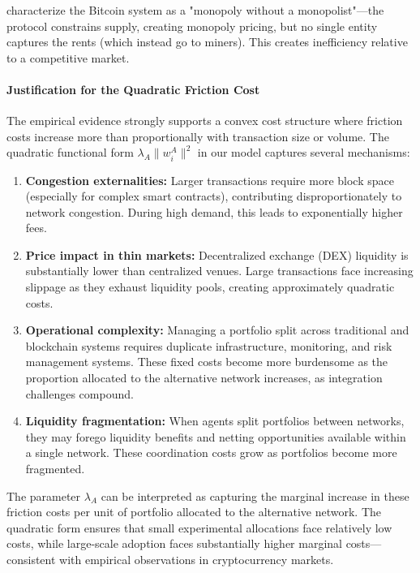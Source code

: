  characterize the Bitcoin system as a "monopoly without a monopolist"—the protocol constrains supply, creating monopoly pricing, but no single entity captures the rents (which instead go to miners). This creates inefficiency relative to a competitive market.


\paragraph{Justification for the Quadratic Friction Cost}

The empirical evidence strongly supports a convex cost structure where friction costs increase more than proportionally with transaction size or volume. The quadratic functional form $\lambda_A \|w_i^A\|^2$ in our model captures several mechanisms:

\begin{enumerate}
    \item \textbf{Congestion externalities:} Larger transactions require more block space (especially for complex smart contracts), contributing disproportionately to network congestion. During high demand, this leads to exponentially higher fees.
    
    \item \textbf{Price impact in thin markets:} Decentralized exchange (DEX) liquidity is substantially lower than centralized venues. Large transactions face increasing slippage as they exhaust liquidity pools, creating approximately quadratic costs.
    
    \item \textbf{Operational complexity:} Managing a portfolio split across traditional and blockchain systems requires duplicate infrastructure, monitoring, and risk management systems. These fixed costs become more burdensome as the proportion allocated to the alternative network increases, as integration challenges compound.
    
    \item \textbf{Liquidity fragmentation:} When agents split portfolios between networks, they may forego liquidity benefits and netting opportunities available within a single network. These coordination costs grow as portfolios become more fragmented.
\end{enumerate}

The parameter $\lambda_A$ can be interpreted as capturing the marginal increase in these friction costs per unit of portfolio allocated to the alternative network. The quadratic form ensures that small experimental allocations face relatively low costs, while large-scale adoption faces substantially higher marginal costs—consistent with empirical observations in cryptocurrency markets.


